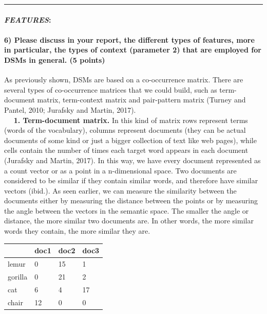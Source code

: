 \documentclass[11pt]{article}
\begin{document}
    \begin{center}\rule{0.5\linewidth}{\linethickness}\end{center}

\hypertarget{features}{%
\paragraph{\texorpdfstring{\emph{FEATURES}:}{FEATURES:}}\label{features}}

    \hypertarget{please-discuss-in-your-report-the-different-types-of-features-more-in-particular-the-types-of-context-parameter-2-that-are-employed-for-dsms-in-general.-5-points}{%
\paragraph{6) Please discuss in your report, the different types of
features, more in particular, the types of context (parameter 2) that
are employed for DSMs in general. (5
points)}\label{please-discuss-in-your-report-the-different-types-of-features-more-in-particular-the-types-of-context-parameter-2-that-are-employed-for-dsms-in-general.-5-points}}

As previously shown, DSMs are based on a co-occurrence matrix. There are
several types of co-occurrence matrices that we could build, such as
term-document matrix, term-context matrix and pair-pattern matrix
(Turney and Pantel, 2010; Jurafsky and Martin, 2017).\\
   \textbf{1. Term-document matrix.} In this kind of matrix rows
represent terms (words of the vocabulary), columns represent documents
(they can be actual documents of some kind or just a bigger collection
of text like web pages), while cells contain the number of times each
target word appears in each document (Jurafsky and Martin, 2017). In
this way, we have every document represented as a count vector or as a
point in a n-dimensional space. Two documents are considered to be
similar if they contain similar words, and therefore have similar
vectors (ibid.). As seen earlier, we can measure the similarity between
the documents either by measuring the distance between the points or by
measuring the angle between the vectors in the semantic space. The
smaller the angle or distance, the more similar two documents are. In
other words, the more similar words they contain, the more similar they
are.

\begin{longtable}[]{@{}llll@{}}
\toprule
& doc1 & doc2 & doc3\tabularnewline
\midrule
\endhead
lemur & 0 & 15 & 1\tabularnewline
gorilla & 0 & 21 & 2\tabularnewline
cat & 6 & 4 & 17\tabularnewline
chair & 12 & 0 & 0\tabularnewline
\bottomrule
\end{longtable}
\end{document}
